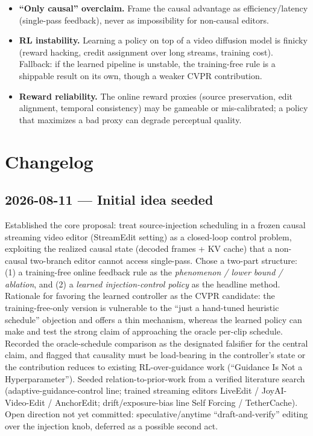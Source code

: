 \documentclass{article}
\begin{document}
\begin{itemize}
  \item \textbf{``Only causal'' overclaim.} Frame the causal advantage as efficiency/latency
        (single-pass feedback), never as impossibility for non-causal editors.
  \item \textbf{RL instability.} Learning a policy on top of a video diffusion model is finicky
        (reward hacking, credit assignment over long streams, training cost). Fallback: if the
        learned pipeline is unstable, the training-free rule is a shippable result on its own,
        though a weaker CVPR contribution.
  \item \textbf{Reward reliability.} The online reward proxies (source preservation, edit
        alignment, temporal consistency) may be gameable or mis-calibrated; a policy that
        maximizes a bad proxy can degrade perceptual quality.
\end{itemize}

\section{Changelog}

\subsection*{2026-08-11 --- Initial idea seeded}
Established the core proposal: treat source-injection scheduling in a frozen causal streaming
video editor (StreamEdit setting) as a closed-loop control problem, exploiting the realized
causal state (decoded frames + KV cache) that a non-causal two-branch editor cannot access
single-pass. Chose a two-part structure: (1) a training-free online feedback rule as the
\emph{phenomenon / lower bound / ablation}, and (2) a \emph{learned injection-control policy}
as the headline method. Rationale for favoring the learned controller as the CVPR candidate:
the training-free-only version is vulnerable to the ``just a hand-tuned heuristic schedule''
objection and offers a thin mechanism, whereas the learned policy can make and test the strong
claim of approaching the oracle per-clip schedule. Recorded the oracle-schedule comparison as
the designated falsifier for the central claim, and flagged that causality must be load-bearing
in the controller's state or the contribution reduces to existing RL-over-guidance work
(``Guidance Is Not a Hyperparameter''). Seeded relation-to-prior-work from a verified
literature search (adaptive-guidance-control line; trained streaming editors LiveEdit /
JoyAI-Video-Edit / AnchorEdit; drift/exposure-bias line Self Forcing / TetherCache).
Open direction not yet committed: speculative/anytime ``draft-and-verify'' editing over the
injection knob, deferred as a possible second act.
\end{document}
